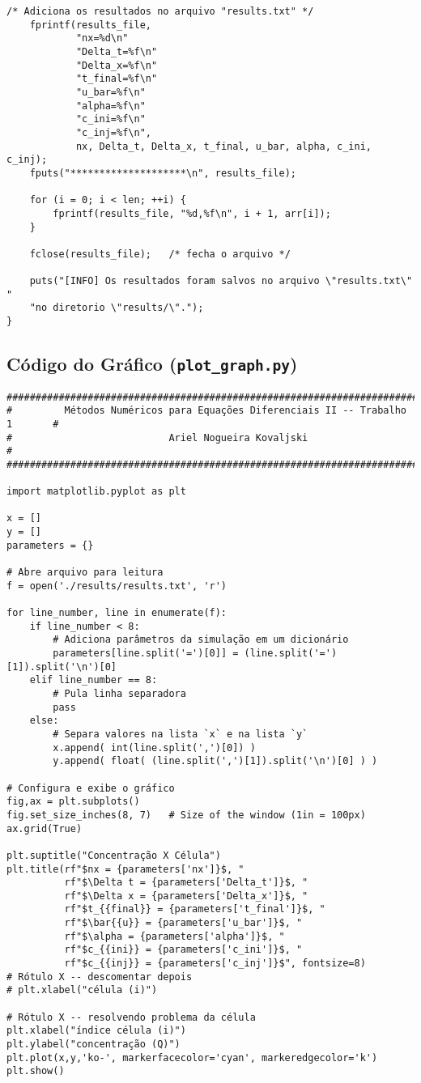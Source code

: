 \begin{Verbatim}[fontsize=\footnotesize]
    /* Adiciona os resultados no arquivo "results.txt" */
    fprintf(results_file,
            "nx=%d\n"
            "Delta_t=%f\n"
            "Delta_x=%f\n"
            "t_final=%f\n"
            "u_bar=%f\n"
            "alpha=%f\n"
            "c_ini=%f\n"
            "c_inj=%f\n",
            nx, Delta_t, Delta_x, t_final, u_bar, alpha, c_ini, c_inj);
    fputs("********************\n", results_file);

    for (i = 0; i < len; ++i) {
        fprintf(results_file, "%d,%f\n", i + 1, arr[i]);
    }

    fclose(results_file);   /* fecha o arquivo */

    puts("[INFO] Os resultados foram salvos no arquivo \"results.txt\" "
    "no diretorio \"results/\".");
}
\end{Verbatim}

\subsection{Código do Gráfico (\texttt{plot\_graph.py})}

\begin{Verbatim}[fontsize=\footnotesize]
###############################################################################
#         Métodos Numéricos para Equações Diferenciais II -- Trabalho 1       #
#                           Ariel Nogueira Kovaljski                          #
###############################################################################

import matplotlib.pyplot as plt

x = []
y = []
parameters = {}

# Abre arquivo para leitura
f = open('./results/results.txt', 'r')

for line_number, line in enumerate(f):
    if line_number < 8:
        # Adiciona parâmetros da simulação em um dicionário
        parameters[line.split('=')[0]] = (line.split('=')[1]).split('\n')[0]
    elif line_number == 8:
        # Pula linha separadora
        pass
    else:
        # Separa valores na lista `x` e na lista `y`
        x.append( int(line.split(',')[0]) )
        y.append( float( (line.split(',')[1]).split('\n')[0] ) )

# Configura e exibe o gráfico
fig,ax = plt.subplots()
fig.set_size_inches(8, 7)   # Size of the window (1in = 100px)
ax.grid(True)

plt.suptitle("Concentração X Célula")
plt.title(rf"$nx = {parameters['nx']}$, "
          rf"$\Delta t = {parameters['Delta_t']}$, "
          rf"$\Delta x = {parameters['Delta_x']}$, "
          rf"$t_{{final}} = {parameters['t_final']}$, "
          rf"$\bar{{u}} = {parameters['u_bar']}$, "
          rf"$\alpha = {parameters['alpha']}$, "
          rf"$c_{{ini}} = {parameters['c_ini']}$, "
          rf"$c_{{inj}} = {parameters['c_inj']}$", fontsize=8)
# Rótulo X -- descomentar depois
# plt.xlabel("célula (i)")

# Rótulo X -- resolvendo problema da célula
plt.xlabel("índice célula (i)")
plt.ylabel("concentração (Q)")
plt.plot(x,y,'ko-', markerfacecolor='cyan', markeredgecolor='k')
plt.show()
\end{Verbatim}
